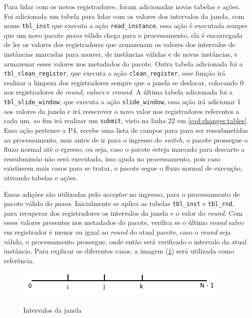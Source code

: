 \documentclass[
    12pt,
    openright, 
    oneside,
    a4paper,
    french,
    english,
    brazil
    ]{facom-ufu-abntex2}
\theoremstyle{definition}
\begin{document}


Para lidar com os novos registradores, foram adicionadas novas tabelas e ações. Foi adicionada um tabela para lidar com os
valores dos intervalos da janela, com nome \texttt{tbl\_inst} que executa a ação \texttt{read\_instance}, essa ação é executada
sempre que um novo pacote \emph{paxos} válido chega para o processamento, ela é encarregada de ler os valores dos registradores
que armazenam os valores dos intervalos de instâncias marcadas para morrer, de instâncias válidas e de novas instâncias, 
e armazenar esses valores nos metadados do pacote. Outra tabela adicionada foi a \texttt{tbl\_clean\_register}, que executa
a ação \texttt{clean\_register}, esse função irá realizar a limpeza dos registradores sempre que a janela se deslocar, colocando
0 nos registradores de \emph{round}, \emph{values} e \emph{vround}. A última tabela adicionada foi a \texttt{tbl\_slide\_window}, que executa a
ação \texttt{slide\_window}, essa ação irá adicionar 1 aos valores da janela e irá reescrever o novo valor nos registradores referentes
a cada um, ao fim irá realizar um \texttt{submit}, visto na linha 22 em \ref{cod:changes:tables}. Essa ação pertence a P4, recebe uma
lista de campos para para ser ressubmetidas ao processamento, mas antes de ir para o ingresso do \emph{switch}, o pacote prossegue o
fluxo normal até o egresso, ou seja, caso o pacote esteja marcado para descarte a ressubmissão não será executada, isso ajuda
no processamento, pois caso existissem mais casos para se tratar, o pacote segue o fluxo normal de execução, ativando
tabelas e ações.

Essas adições são utilizadas pelo \emph{acceptor} no ingresso, para o processamento de pacote válido do \emph{paxos}. Inicialmente se
aplica as tabelas \texttt{tbl\_inst} e \texttt{tbl\_rnd}, para recuperar dos registradores os intervalos da janela e o valor 
do \emph{round}. Com esses valores presentes nos metadados do pacote, verifica se o último \emph{round} salvo em registrador é menor
ou igual ao \emph{round} do atual pacote, caso o \emph{round} seja válido, o processamento prossegue, onde então será verificado o intervalo
da atual instância. Para explicar os diferentes casos, a imagem (\ref{fig:window-intervals}) será utilizada como referência.

\begin{figure}[ht]
    \caption{Intervalos da janela}
    \centering
    \includegraphics[scale=0.8]{images/windowOk.png}
    \label{fig:window-intervals}
\end{figure}
\end{document}
